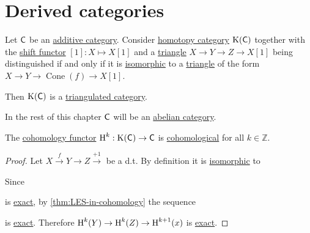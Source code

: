 \documentclass[../../main]{subfiles}
\begin{document}
\chapter{Derived categories}

\begin{theorem}
  Let \(\mathsf{C}\) be an \hyperref[def:additive-category]{additive category}.
  Consider \hyperref[def:homotopy-category]{homotopy category} \(\operatorname{K}(\mathsf{C})\) together with the \hyperref[def:shift-functor]{shift functor} \([1]: X \mapsto X[1]\) and a \hyperref[def:triangle]{triangle} \(X \to Y \to Z \to X[1]\) being distinguished if and only if it is \hyperref[def:catetgorical-isomorphism]{isomorphic} to a \hyperref[def:triangle]{triangle} of the form \(X \to Y \to \operatorname{Cone}(f) \to X[1]\).

  Then \(\operatorname{K}(\mathsf{C})\) is a \hyperref[def:triangulated-category]{triangulated category}.
\end{theorem}

In the rest of this chapter \(\mathsf{C}\) will be an \hyperref[def:abelian-category]{abelian category}.

\begin{proposition}\label{prop:cohomology-is-cohomological}
  The \hyperref[def:cohomology]{cohomology functor} \(\operatorname{H}^{k}: \operatorname{K}(\mathsf{C}) \to \mathsf{C}\) is \hyperref[def:cohomological-functor]{cohomological} for all \(k \in \mathbb{Z}\).
\end{proposition}
\begin{proof}
  Let \(X \xrightarrow{f} Y \to Z \xrightarrow{+1}\) be a d.t.
  By definition it is \hyperref[def:categorical-isomorphism]{isomorphic} to
  \begin{center}
  \end{center}
  Since
  \begin{center}
  \end{center}
  is \hyperref[def:exact-sequence]{exact}, by \autoref{thm:LES-in-cohomology} the sequence
  \begin{center}
  \end{center}
  is \hyperref[def:exact-sequence]{exact}.
  Therefore \(\operatorname{H}^{k}(Y) \to \operatorname{H}^{k}(Z) \to \operatorname{H}^{k+1}(x)\) is \hyperref[def:exact-sequence]{exact}.
\end{proof}
\end{document}
